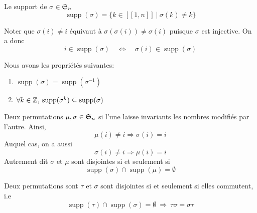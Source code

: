 \begin{definition}
        Le support de $\sigma\in \mathfrak{S}_n$\\
        \[
        \operatorname{supp}(\sigma)=\{k\in [[1,n]]\: |\: \sigma(k)\neq k\}
        \]
    \end{definition}

\begin{remarque}
    Noter que $\sigma(i) \neq i$ équivaut à $\sigma(\sigma(i)) \neq \sigma(i)$ puisque $\sigma$ est injective. On a donc
    \[
    i\in \operatorname{supp}(\sigma) \quad \Leftrightarrow \quad \sigma(i)\in \operatorname{supp}(\sigma)
    \]
\end{remarque}
\begin{remarque}
    Nous avons les propriétés suivantes:
    \begin{enumerate}
        \item $\operatorname{supp}(\sigma)=\operatorname{supp}(\sigma^{-1})$
        \item $\forall k \in \mathbb{Z},\: \operatorname{supp}(\sigma^k)\subseteq\operatorname{supp}(\sigma)$
    \end{enumerate}
\end{remarque}

\begin{definition}
        Deux permutations $\mu,\sigma\in \mathfrak{S}_n$ si l'une laisse invariants les nombres modifiés par l'autre. Ainsi,
    \[
    \mu(i)\neq i \Rightarrow \sigma(i)=i
    \]
    Auquel cas, on a aussi
    \[
    \sigma(i)\neq i \Rightarrow\mu(i)=i
    \]
    Autrement dit $\sigma$ et $\mu$ sont disjointes si et seulement si
    \[
    \operatorname{supp}(\sigma)\cap \operatorname{supp}(\mu)=\emptyset
    \]
    \end{definition}

    \begin{proposition}
        Deux permutations sont $\tau$  et $\sigma$ sont disjointes si et seulement si elles commutent, i.e
        \[
        \operatorname{supp}(\tau)\cap \operatorname{supp}(\sigma)=\emptyset \: \Rightarrow \:\tau \sigma=\sigma\tau
        \]
    \end{proposition}


